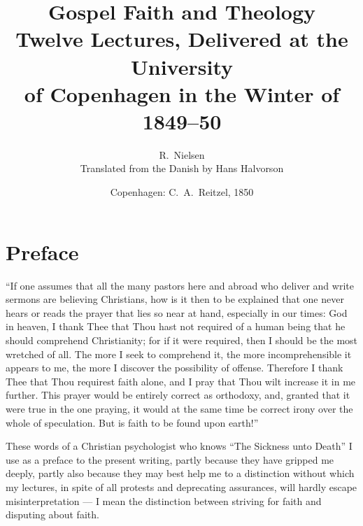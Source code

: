 \documentclass[12pt,a4paper]{book}
\title{\textbf{Gospel Faith and Theology}\\[6pt]
  \large Twelve Lectures, Delivered at the University\\
  of Copenhagen in the Winter of 1849--50}
\author{R.\ Nielsen\\[4pt]
  \small Translated from the Danish by Hans Halvorson}
\date{Copenhagen: C.\ A.\ Reitzel, 1850}
\begin{document}
\maketitle
\thispagestyle{empty}
\newpage

\tableofcontents
\newpage

\chapter*{Preface}
\label{ch:forord}

``If one assumes that all the many pastors here and abroad who deliver and
write sermons are believing Christians, how is it then to be explained that
one never hears or reads the prayer that lies so near at hand, especially in
our times: God in heaven, I thank Thee that Thou hast not required of a human
being that he should comprehend Christianity; for if it were required, then I
should be the most wretched of all. The more I seek to comprehend it, the more
incomprehensible it appears to me, the more I discover the possibility of
offense. Therefore I thank Thee that Thou requirest faith alone, and I pray
that Thou wilt increase it in me further. This prayer would be entirely correct
as orthodoxy, and, granted that it were true in the one praying, it would at
the same time be correct irony over the whole of speculation. But is faith to
be found upon earth!''

These words of a Christian psychologist who knows ``The Sickness unto Death''
I use as a preface to the present writing, partly because they have gripped me
deeply, partly also because they may best help me to a distinction without
which my lectures, in spite of all protests and deprecating assurances, will
hardly escape misinterpretation --- I mean the distinction between striving
for faith and disputing about faith.
\end{document}

